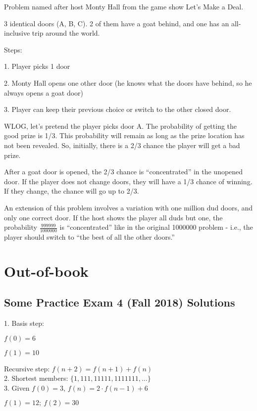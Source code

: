 \documentclass[english,openany]{book}
\begin{document}
    Problem named after host Monty Hall from the game show Let’s Make a Deal.

    3 identical doors (A, B, C). 2 of them have a goat behind, and one has an all-inclusive trip around the world.

    Steps:

    1. Player picks 1 door

    2. Monty Hall opens one other door (he knows what the doors have behind, so he always opens a goat door)

    3. Player can keep their previous choice or switch to the other closed door.

    WLOG, let’s pretend the player picks door A. The probability of getting the good prize is 1/3. This probability will remain as long as the prize location has not been revealed. So, initially, there is a 2/3 chance the player will get a bad prize.

    After a goat door is opened, the 2/3 chance is “concentrated” in the unopened door. If the player does not change doors, they will have a 1/3 chance of winning. If they change, the chance will go up to 2/3.

    An extension of this problem involves a variation with one million dud doors, and only one correct door. If the host shows the player all duds but one, the probability $\frac{999999}{1000000}$ is “concentrated” like in the original 1000000 problem - i.e., the player should switch to “the best of all the other doors.”

    \chapter{Out-of-book}

    \section{Some Practice Exam 4 (Fall 2018) Solutions}

    1. Basis step:

    $f(0) = 6$

    $f(1) = 10$

    Recursive step: $f(n+2) = f(n+1) + f(n)$\\

    2. Shortest members: $\{1,111,11111,1111111,...\}$\\

    3. Given $f(0) = 3$, $f(n) = 2 \cdot f(n-1) + 6$

    $f(1) = 12;\ f(2) = 30$\\
\end{document}
